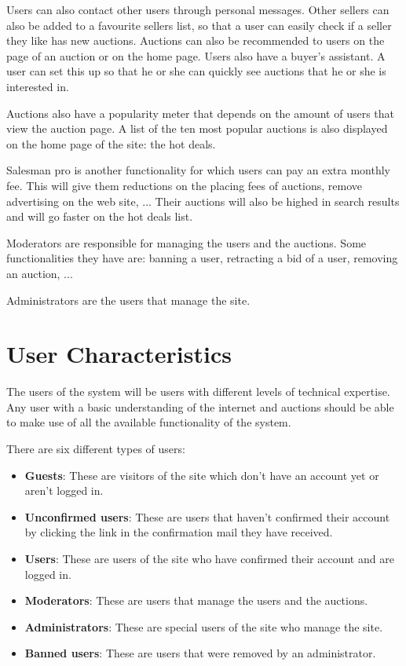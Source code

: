 	Users can also contact other users through personal messages. Other sellers can also
	be added to a favourite sellers list, so that a user can easily check if a 
	seller they like has new auctions. Auctions can also be recommended to users on the 
	page of an auction or on the home page. Users also have a buyer's assistant. A user
	can set this up so that he or she can quickly see auctions that he or she is interested
	in.
	
	Auctions also have a popularity meter that depends on the amount of users that view
	the auction page. A list of the ten most popular auctions is also displayed on the
	home page of the site: the hot deals.
	
	Salesman pro is another functionality for which users can pay an extra monthly fee. This
	will give them reductions on the placing fees of auctions, remove advertising on the
	web site, ... Their auctions will also be highed in search results and will go faster 
	on the hot deals list.
	
	Moderators are responsible for managing the users and the auctions. Some functionalities they have are: 
	banning a user, retracting a bid of a user, removing an auction, ... 
	
	Administrators are the users that manage the site. 
	
\section{User Characteristics}
	The users of the system will be users with different levels of 
	technical expertise. Any user with a basic understanding of the 
	internet and auctions should be able to make use of all the 
	available functionality of the system.
	
	There are six different types of users:
	
	\begin{itemize}
		\item \textbf{Guests}: These are visitors of the site which don't 
		have an account yet or aren't logged in.
		\item \textbf{Unconfirmed users}: These are users that haven't confirmed 
		their account by clicking the link in the confirmation mail they have received.
		\item \textbf{Users}: These are users of the site who have confirmed their 
		account and are logged in.
		\item \textbf{Moderators}: These are users that manage the users and the auctions.
		\item \textbf{Administrators}: These are special users of the 
		site who manage the site.
		\item \textbf{Banned users}: These are users that were removed by
		an administrator.
	\end{itemize}
	
